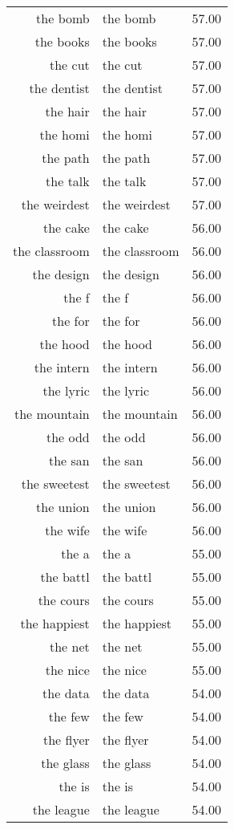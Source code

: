 \begin{table}[ht]
\begin{tabular}{rlr}
  the bomb & the bomb & 57.00 \\ 
  the books & the books & 57.00 \\ 
  the cut & the cut & 57.00 \\ 
  the dentist & the dentist & 57.00 \\ 
  the hair & the hair & 57.00 \\ 
  the homi & the homi & 57.00 \\ 
  the path & the path & 57.00 \\ 
  the talk & the talk & 57.00 \\ 
  the weirdest & the weirdest & 57.00 \\ 
  the cake & the cake & 56.00 \\ 
  the classroom & the classroom & 56.00 \\ 
  the design & the design & 56.00 \\ 
  the f & the f & 56.00 \\ 
  the for & the for & 56.00 \\ 
  the hood & the hood & 56.00 \\ 
  the intern & the intern & 56.00 \\ 
  the lyric & the lyric & 56.00 \\ 
  the mountain & the mountain & 56.00 \\ 
  the odd & the odd & 56.00 \\ 
  the san & the san & 56.00 \\ 
  the sweetest & the sweetest & 56.00 \\ 
  the union & the union & 56.00 \\ 
  the wife & the wife & 56.00 \\ 
  the a & the a & 55.00 \\ 
  the battl & the battl & 55.00 \\ 
  the cours & the cours & 55.00 \\ 
  the happiest & the happiest & 55.00 \\ 
  the net & the net & 55.00 \\ 
  the nice & the nice & 55.00 \\ 
  the data & the data & 54.00 \\ 
  the few & the few & 54.00 \\ 
  the flyer & the flyer & 54.00 \\ 
  the glass & the glass & 54.00 \\ 
  the is & the is & 54.00 \\ 
  the league & the league & 54.00 \\ 

\end{tabular}
\end{table}
